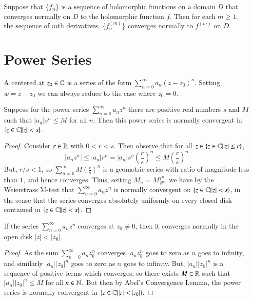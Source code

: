 \begin{theorem}
    Suppose that $\{f_n\}$ is a sequence of holomorphic functions on a domain $D$ that converges normally on $D$ to the holomorphic function $f$. Then for each $m \geq 1$, the sequence of $m$th derivatives, $\{f_n^{(m)}\}$ converges normally to $f^{(m)}$ on $D$.
\end{theorem}





\section{Power Series}

\begin{definition}
    A  centered at $z_0 \in \mathbb C$ is a series of the form $\sum_{n=0}^{\infty}a_n(z-z_0)^n$. Setting $w = z-z_0$ we can always reduce to the case where $z_0 = 0$.
\end{definition}


\begin{theorem}
    Suppose for the power series $\sum_{n=0}^{\infty}a_nz^n$ there are positive real numbers $s$ and $M$ such that $|a_n|s^n \leq M$ for all $n$. Then this power series is normally convergent in $\{z \in \mathbb C\vert |z|<s\}$. 
\end{theorem}
\begin{proof}
    Consider $r \in \mathbb R$ with $0 < r < s$. Then observe that for all $z \in \{z\in\mathbb C\vert |z| \leq r\}$, \begin{equation*}
        |a_nz^n| \leq |a_n|r^n = |a_n|s^n\left(\frac{r}{s}\right)^n \leq M\left(\frac{r}{s}\right)^n
    \end{equation*}
    But, $r/s < 1$, so $\sum_{n=0}^{\infty}M\left(\frac{r}{s}\right)^n$ is a geomotric series with ratio of magnitude less than $1$, and hence converges. Thus, setting $M_n = M\frac{r^n}{s^n}$, we have by the Weierstrass M-test that $\sum_{n=0}^{\infty}a_nz^n$ is normally convergent on $\{z \in \mathbb C\vert|z| <s\}$, in the sense that the series converges absolutely uniformly on every closed disk contained in $\{z \in \mathbb C\vert|z| < s\}$.
\end{proof}

\begin{corollary}
    If the series $\sum_{n=0}^{\infty}a_nz^n$ converges at $z_0 \neq 0$, then it converges normally in the open disk $|z| < |z_0|$.
\end{corollary}
\begin{proof}
    As the sum $\sum_{n=0}^{\infty}a_nz_0^n$ converges, $a_nz_0^n$ goes to zero as $n$ goes to infinity, and similarly $|a_n||z_0|^n$ goes to zero as $n$ goes to infinity. But, $|a_n||z_0|^n$ is a sequence of positive terms which converges, so there exists $M \in \mathbb R$ such that $|a_n||z_0|^n \leq M$ for all $n \in \mathbb N$. But then by Abel's Convergence Lemma, the power series is normally convergent in $\{z \in \mathbb C\vert |z| < |z_0|\}$.
\end{proof}

